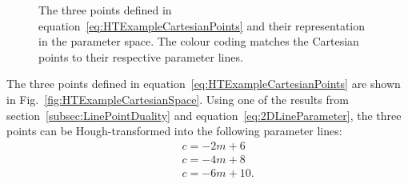 \begin{figure}%
  \centering
  \hspace{1em}
  \caption{The three points defined in equation~\ref{eq:HTExampleCartesianPoints} and their representation in the parameter space.  The colour coding matches the Cartesian points to their respective parameter lines.}
  \label{fig:HTExample}
\end{figure}
\newline
\newline
The three points defined in equation~\ref{eq:HTExampleCartesianPoints} are shown in Fig.~\ref{fig:HTExampleCartesianSpace}.  Using one of the results from section~\ref{subsec:LinePointDuality} and equation~\ref{eq:2DLineParameter}, the three points can be Hough-transformed into the following parameter lines:
\begin{equation}
  \begin{split}
    &\quad c = -2m + 6 \\
    &\quad c = -4m + 8 \\
    &\quad c = -6m + 10.
  \end{split}
  \label{eq:HTExampleParameterLines}
\end{equation}
